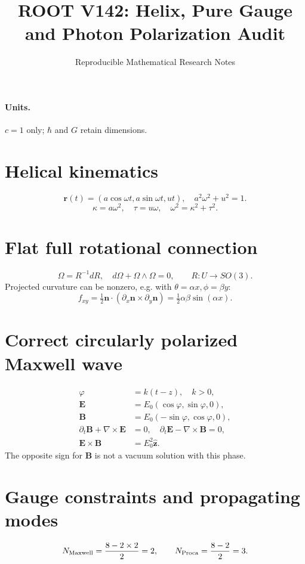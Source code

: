 \documentclass[11pt]{article}
\title{ROOT V142: Helix, Pure Gauge and Photon Polarization Audit}
\author{Reproducible Mathematical Research Notes}
\begin{document}
\maketitle
\paragraph{Units.} $c=1$ only; $\hbar$ and $G$ retain dimensions.
\section{Helical kinematics}
\begin{equation}\mathbf r(t)=(a\cos\omega t,a\sin\omega t,ut),\quad a^2\omega^2+u^2=1.\end{equation}
\begin{equation}\kappa=a\omega^2,\quad\tau=u\omega,\quad\omega^2=\kappa^2+\tau^2.\end{equation}
\section{Flat full rotational connection}
\begin{equation}\Omega=R^{-1}dR,\quad d\Omega+\Omega\wedge\Omega=0,\qquad R:U\to SO(3).\end{equation}
Projected curvature can be nonzero, e.g. with $\theta=\alpha x,\phi=\beta y$:
\begin{equation}f_{xy}=\tfrac12\mathbf n\cdot(\partial_x\mathbf n\times\partial_y\mathbf n)=\tfrac12\alpha\beta\sin(\alpha x).\end{equation}
\section{Correct circularly polarized Maxwell wave}
\begin{align}
\varphi&=k(t-z),\quad k>0,\\
\mathbf E&=E_0(\cos\varphi,\sin\varphi,0),\\
\mathbf B&=E_0(-\sin\varphi,\cos\varphi,0),\\
\partial_t\mathbf B+\nabla\times\mathbf E&=0,\quad\partial_t\mathbf E-\nabla\times\mathbf B=0,\\
\mathbf E\times\mathbf B&=E_0^2\hat{\mathbf z}.
\end{align}
The opposite sign for $\mathbf B$ is not a vacuum solution with this phase.
\section{Gauge constraints and propagating modes}
\begin{equation}N_{\rm Maxwell}=\frac{8-2\times2}{2}=2,\qquad N_{\rm Proca}=\frac{8-2}{2}=3.\end{equation}
\end{document}
